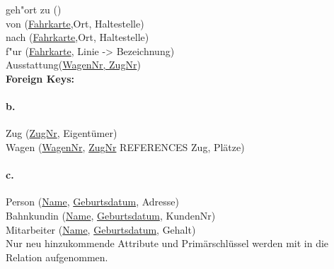 \documentclass[12pt]{article}
\begin{document}
	 	geh"ort zu ()\\[1,3em]
	 	
	 	von (\underline{Fahrkarte},Ort, Haltestelle)\\[1,3em]
	 	
	 	nach (\underline{Fahrkarte},Ort, Haltestelle)\\[1,3em]
	 	
	 	f"ur (\underline{Fahrkarte}, Linie -> Bezeichnung)\\[1,3em]
	 	
	 	Ausstattung(\underline{WagenNr, ZugNr})\\[2 em]
	 	
	 	\textbf{Foreign Keys:}\\[1,3em]
	 	
 	
 	\paragraph*{b.}	
 	
 	Zug (\underline{ZugNr}, Eigentümer)\\[1.3em]
 	
 	Wagen (\underline{WagenNr}, \underline{ZugNr} REFERENCES Zug, Plätze)\\[1.3em]
 	
 	\paragraph*{c.}
 	Person (\underline{Name}, \underline{Geburtsdatum}, Adresse) \\[1,3em]
 	
 	Bahnkundin (\underline{Name}, \underline{Geburtsdatum}, KundenNr) \\[1,3em]
 	
 	Mitarbeiter (\underline{Name}, \underline{Geburtsdatum}, Gehalt) \\[1,3em]
 	Nur neu hinzukommende Attribute und Primärschlüssel werden mit in die Relation aufgenommen.
 		
\end{document}
